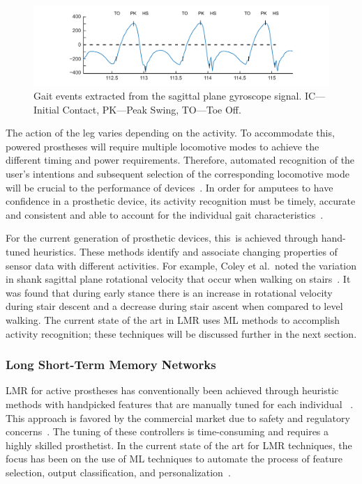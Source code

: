 \begin{figure}[!hbt]
    \centering
    \includegraphics[width=\textwidth]{content/4-LSTM_Behaviour/gyro_trace_hs.pdf}
    \caption[Gait events extracted from the sagittal plane gyroscope signal.]{Gait events extracted from the sagittal plane gyroscope signal. IC---Initial Contact, PK---Peak Swing, TO---Toe Off.}
    \label{fig:y-gyro-hs-to}
\end{figure}

The action of the leg varies depending on the activity. To accommodate this, powered prostheses will require multiple locomotive modes to achieve the different timing and power requirements. Therefore, automated recognition of the user's intentions and subsequent selection of the corresponding locomotive mode will be crucial to the performance of devices~\cite{Tucker2015, Windrich2016, Zhang2015}. In order for amputees to have confidence in a prosthetic device, its activity recognition must be timely, accurate and consistent and able to account for the individual gait characteristics~\cite{Pedroli2019, Sinha2011, Ponce2016}.

For the current generation of prosthetic devices, this~is achieved through hand-tuned heuristics. These methods identify and associate changing properties of sensor data with different activities. For example, Coley et al.~noted the variation in shank sagittal plane rotational velocity that occur when walking on stairs~\cite{Coley2005}. It was found that during early stance there is an increase in rotational velocity during stair descent and a decrease during stair ascent when compared to level walking. The current state of the art in LMR uses ML methods to accomplish activity recognition; these techniques will be discussed further in the next section.

\subsubsection{Long Short-Term Memory Networks}
\label{sec:lstm_therory}
LMR for active prostheses has conventionally been achieved through heuristic methods with handpicked features that are manually tuned for each individual ~\cite{Maqbool2017, Xu2018}. This approach is favored by the commercial market due to safety and regulatory concerns~\cite{Fluit2020}.  The tuning of these controllers is time-consuming and requires a highly skilled prosthetist. In the current state of the art for LMR techniques, the focus has been on the use of ML techniques to automate the process of feature selection, output classification, and personalization~\cite{Labarriere2020}.

